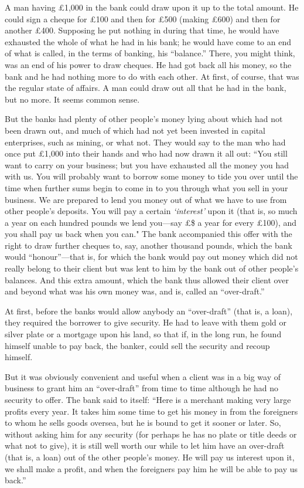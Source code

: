 \documentclass{book}
\begin{document}
A man having £1,000 in the bank could draw upon it up to the total amount. He could sign a cheque for £100 and then for £500 (making £600) and then for another £400. Supposing he put nothing in during that time, he would have exhausted the whole of what he had in his bank; he would have come to an end of what is called, in the terms of banking, his “balance.” There, you might think, was an end of his power to draw cheques. He had got back all his money, so the bank and he had nothing more to do with each other. At first, of course, that was the regular state of affairs. A man could draw out all that he had in the bank, but no more. It seems common sense.

But the banks had plenty of other people’s money lying about which had not been drawn out, and much of which had not yet been invested in capital enterprises, such as mining, or what not. They would say to the man who had once put £1,000 into their hands and who had now drawn it all out: “You still want to carry on your business; but you have exhausted all the money you had with us. You will probably want to borrow some money to tide you over until the time when further sums begin to come in to you through what you sell in your business. We are prepared to lend you money out of what we have to use from other people’s deposits. You will pay a certain \emph{‘interest’} upon it (that is, so much a year on each hundred pounds we lend you—say £\$ a year for every £100), and you shall pay us back when you can." The bank accompanied this offer with the right to draw further cheques to, say, another thousand pounds, which the bank would “honour”—that is, for which the bank would pay out money which did not really belong to their client but was lent to him by the bank out of other people’s balances. And this extra amount, which the bank thus allowed their client over and beyond what was his own money was, and is, called an “over-draft.”

At first, before the banks would allow anybody an “over-draft” (that is, a loan), they required the borrower to give security. He had to leave with them gold or silver plate or a mortgage upon his land, so that if, in the long run, he found himself unable to pay back, the banker, could sell the security and recoup himself.

But it was obviously convenient and useful when a client was in a big way of business to grant him an “over-draft” from time to time although he had no security to offer. The bank said to itself: “Here is a merchant making very large profits every year. It takes him some time to get his money in from the foreigners to whom he sells goods oversea, but he is bound to get it sooner or later. So, without asking him for any security (for perhaps he has no plate or title deeds or what not to give), it is still well worth our while to let him have an over-draft (that is, a loan) out of the other people’s money. He will pay us interest upon it, we shall make a profit, and when the foreigners pay him he will be able to pay us back.”
\end{document}
